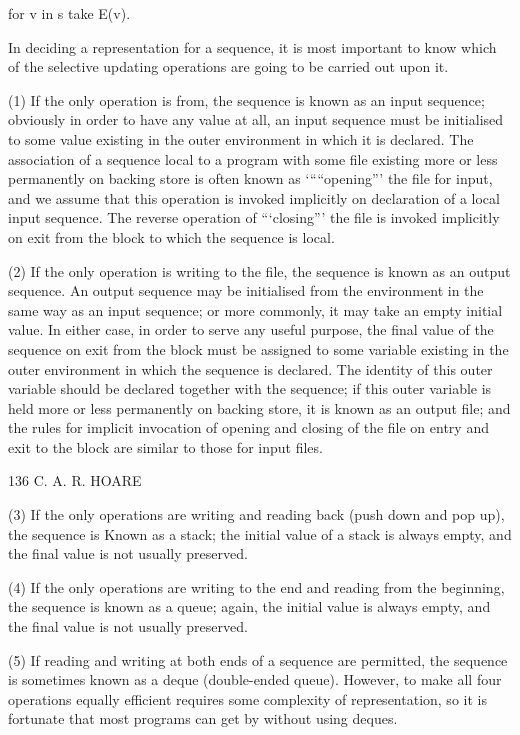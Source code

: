 {{{{				for v in s take E(v).
				
				In deciding a representation for a sequence, it is most important to know which of the selective updating operations are going to be carried out upon it.
				
				(1) If the only operation is from, the sequence is known as an input sequence; obviously in order to have any value at all, an input sequence must be initialised to some value existing in the outer environment in which it is declared. The association of a sequence local to a program with some file existing more or less permanently on backing store is often known as ‘““opening”’ the file for input, and we assume that this operation is invoked implicitly on declaration of a local input sequence. The reverse operation of “‘closing”’ the file is invoked implicitly on exit from the block to which the sequence is local.
				
				(2) If the only operation is writing to the file, the sequence is known as an output sequence. An output sequence may be initialised from the environment in the same way as an input sequence; or more commonly, it may take an empty initial value. In either case, in order to serve any useful purpose, the final value of the sequence on exit from the block must be assigned to some variable existing in the outer environment in which the sequence is declared. The identity of this outer variable should be declared together with the sequence; if this outer variable is held more or less permanently on backing store, it is known as an output file; and the rules for implicit invocation of opening and closing of the file on entry and exit to the block are similar to those for input files.
				
				136 C. A. R. HOARE
				
				(3) If the only operations are writing and reading back (push down and pop up), the sequence is Known as a stack; the initial value of a stack is always empty, and the final value is not usually preserved.
				
				(4) If the only operations are writing to the end and reading from the beginning, the sequence is known as a queue; again, the initial value is always empty, and the final value is not usually preserved.
				
				(5) If reading and writing at both ends of a sequence are permitted, the sequence is sometimes known as a deque (double-ended queue). However, to make all four operations equally efficient requires some complexity of representation, so it is fortunate that most programs can get by without using deques.
				
}}}}
